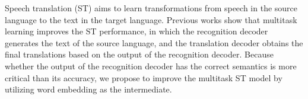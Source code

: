 Speech translation (ST) aims to learn transformations from speech in the source language to the text in the target language. Previous works show that multitask learning improves the ST performance, in which the recognition decoder generates the text of the source language, and the translation decoder obtains the final translations based on the output of the recognition decoder. Because whether the output of the recognition decoder has the correct semantics is more critical than its accuracy, we propose to improve the multitask ST model by utilizing word embedding as the intermediate.
